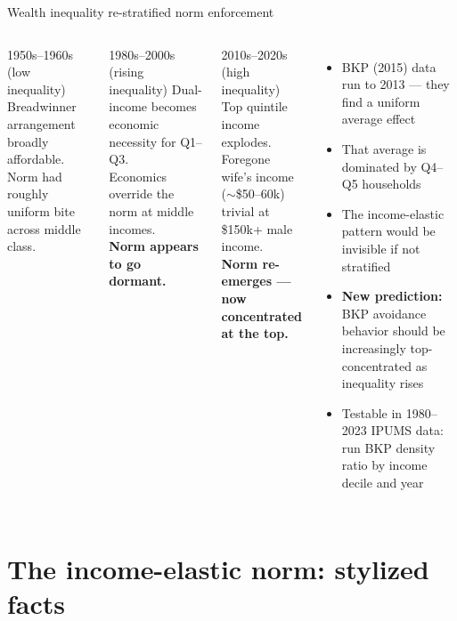 \documentclass[10pt,aspectratio=169]{beamer}
\begin{document}
\begin{frame}{Wealth inequality re-stratified norm enforcement}
  \begin{columns}[c]
      \begin{block}{1950s–1960s (low inequality)}
        Breadwinner arrangement broadly affordable.\\
        Norm had roughly uniform bite across middle class.
      \end{block}
      \medskip
      \begin{block}{1980s–2000s (rising inequality)}
        Dual-income becomes economic necessity for Q1–Q3.\\
        Economics override the norm at middle incomes.\\
        \textbf{Norm appears to go dormant.}
      \end{block}
      \medskip
      \begin{alertblock}{2010s–2020s (high inequality)}
        Top quintile income explodes.\\
        Foregone wife's income ($\sim$\$50–60k) trivial at \$150k+ male income.\\
        \textbf{Norm re-emerges — now concentrated at the top.}
      \end{alertblock}
      \begin{itemize}
        \item BKP (2015) data run to 2013 — they find a uniform average effect
        \item That average is dominated by Q4–Q5 households
        \item The income-elastic pattern would be invisible if not stratified
        \item \textbf{New prediction:} BKP avoidance behavior should be
              increasingly top-concentrated as inequality rises
        \item Testable in 1980–2023 IPUMS data: run BKP density ratio by
              income decile and year
      \end{itemize}
  \end{columns}
\end{frame}

\section{The income-elastic norm: stylized facts}
\end{document}
